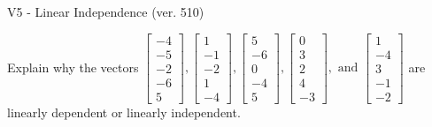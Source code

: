 \begin{exercise}
  \begin{exerciseTitle}V5 - Linear Independence (ver. 510)\end{exerciseTitle}
  \begin{exerciseStatement}
    Explain why the vectors \(\left[\begin{array}{r}
-4 \\
-5 \\
-2 \\
-6 \\
5
\end{array}\right] , \left[\begin{array}{r}
1 \\
-1 \\
-2 \\
1 \\
-4
\end{array}\right] , \left[\begin{array}{r}
5 \\
-6 \\
0 \\
-4 \\
5
\end{array}\right] , \left[\begin{array}{r}
0 \\
3 \\
2 \\
4 \\
-3
\end{array}\right] , \text{ and } \left[\begin{array}{r}
1 \\
-4 \\
3 \\
-1 \\
-2
\end{array}\right]\) are linearly dependent or linearly independent.	



\end{exerciseStatement}
\end{exercise}
